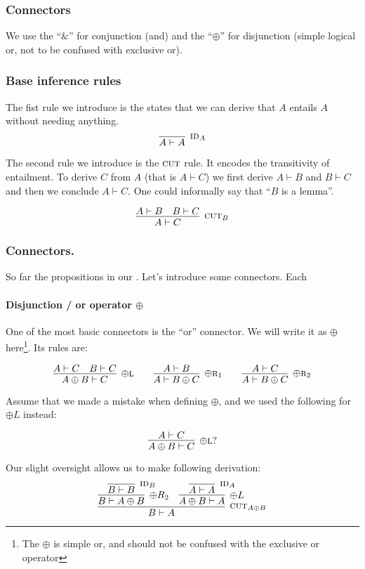 \documentclass{article}
\begin{document}
\subsubsection{Connectors}

We use the ``\(\&\)'' for conjunction (and) and the ``\(\oplus\)'' for
disjunction (simple logical or, not to be confused with exclusive or).

\subsubsection{Base inference rules}
The fist rule we introduce is the states that we can derive that \(A\) entails \(A\) without needing anything. 
\[
\infer[\textsc{id}_A]{A \vdash A}{}
\]

The second rule we introduce is the \(\textsc{cut}\) rule. It encodes the transitivity of entailment. To derive \(C\) from \(A\) (that is \(A \vdash C\)) we first derive \(A \vdash B\) and \(B \vdash C\) and then we conclude \(A \vdash C\). One could informally say that ``\(B\) is a lemma''.

\[
\infer[\textsc{cut}_B]
{A \vdash C}{A \vdash B & B \vdash C}
\]


\subsubsection{Connectors.} 
So far the propositions in our . Let's introduce some connectors. Each 

\paragraph{Disjunction / or operator \(\oplus\)}
One of the most basic connectors is the ``or'' connector. We will write it as \(\oplus\) here\footnote{The \(\oplus\) is simple or, and should not be confused with the exclusive or operator}. Its rules are:

\[
\infer[\oplus\textsc{l}]
{A \oplus B \vdash C}{A \vdash C & B \vdash C}
\qquad
\infer[\oplus\textsc{r}_1]
{A \vdash B \oplus C}{A \vdash B}
\qquad
\infer[\oplus\textsc{r}_2]
{A \vdash B \oplus C}{A \vdash C}
\]



Assume that we made a mistake when defining \( \oplus \), and we used the following for \(\oplus L\) instead:

\[
\infer[\oplus \textsc{l}?]{A \oplus B \vdash C}{A \vdash C}
\]

Our slight oversight allows us to make following derivation:
\[
\infer[\textsc{cut}_{A \oplus B}]
{B \vdash A}
{
	\infer[\oplus R_2]
	{B \vdash A \oplus B}
	{
		\infer[\textsc{id}_B]
		{B \vdash B}
		{}
	}
	&
	\infer[\oplus L]
	{A \oplus B \vdash A}
	{
		\infer[\textsc{id}_A]
		{A \vdash A}
		{}
	}
}
\]
\end{document}
